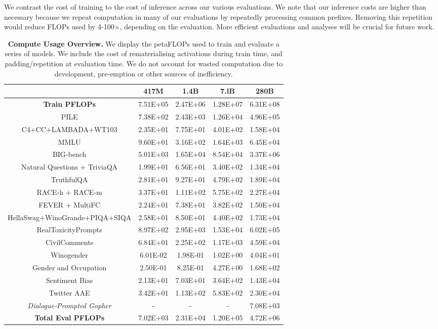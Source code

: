 \documentclass[11pt, a4paper, logo, internal, copyright, nonumbering]{deepmind}
\newcommand{\bigbench}{BIG-bench\xspace}
\newcommand{\gopherchat}{\textit{Dialogue-Prompted Gopher}\xspace}
\begin{document}
We contrast the cost of training to the cost of inference across our various evaluations. We note that our inference costs are higher than necessary because we repeat computation in many of our evaluations by repeatedly processing common prefixes. Removing this repetition would reduce FLOPs used by 4-100$\times$, depending on the evaluation. More efficient evaluations and analyses will be crucial for future work.

\begin{table}[t]
    \centering
    \begin{tabular}{c|cccc}
    \toprule
        & 417M & 1.4B & 7.lB & 280B \\        
        \midrule
        \textbf{Train PFLOPs} & 7.51E+05 & 2.47E+06 & 1.28E+07 & 6.31E+08 \\
        \midrule
		PILE & 7.38E+02 & 2.43E+03 & 1.26E+04 & 4.96E+05 \\
		C4+CC+LAMBADA+WT103 & 2.35E+01 & 7.75E+01 & 4.01E+02 & 1.58E+04 \\
		MMLU & 9.60E+01 & 3.16E+02 & 1.64E+03 & 6.45E+04 \\
		\bigbench & 5.01E+03 & 1.65E+04 & 8.54E+04 & 3.37E+06 \\
		Natural Questions + TriviaQA & 1.99E+01 & 6.56E+01 & 3.40E+02 & 1.34E+04 \\
		TruthfulQA & 2.81E+01 & 9.27E+01 & 4.79E+02 & 1.89E+04 \\
		RACE-h + RACE-m & 3.37E+01 & 1.11E+02 & 5.75E+02 & 2.27E+04 \\
		FEVER + MultiFC & 2.24E+01 & 7.38E+01 & 3.82E+02 & 1.50E+04 \\
		HellaSwag+WinoGrande+PIQA+SIQA & 2.58E+01 & 8.50E+01 & 4.40E+02 & 1.73E+04 \\
		RealToxicityPrompts & 8.97E+02 & 2.95E+03 & 1.53E+04 & 6.02E+05 \\
		CivilComments & 6.84E+01 & 2.25E+02 & 1.17E+03 & 4.59E+04 \\
		Winogender & 6.01E-02 & 1.98E-01 & 1.02E+00 & 4.04E+01 \\
        Gender and Occupation & 2.50E-01 & 8.25E-01 & 4.27E+00 & 1.68E+02 \\
		Sentiment Bias & 2.13E+01 & 7.03E+01 & 3.64E+02 & 1.43E+04 \\
		Twitter AAE & 3.42E+01 & 1.13E+02 & 5.83E+02 & 2.30E+04 \\
		\gopherchat & - & - & - & 7.08E+03  \\
		\midrule
        \textbf{Total Eval PFLOPs} & 7.02E+03 & 2.31E+04 & 1.20E+05 & 4.72E+06 \\
        \bottomrule
    \end{tabular}
    \caption{\textbf{Compute Usage Overview.} We display the petaFLOPs used to train and evaluate a series of models. We include the cost of rematerialising activations during train time, and padding/repetition at evaluation time. We do not account for wasted computation due to development, pre-emption or other sources of inefficiency.}
    \label{tab:flopscost}
\end{table}
\end{document}
